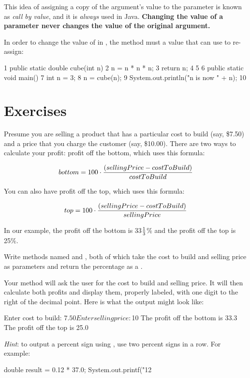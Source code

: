 This idea of assigning a copy of the argument's value to the parameter is known as {\em call by value}, and it is {\em always} used in Java.  {\bf Changing the value of a parameter never changes the value of the original argument.}

In order to change the value of  in , the  method must  a value that  can use to re-assign:

\begin{code}
 1 public static double cube(int n) {
 2     n = n * n * n;
 3     return n;
 4 }
 5
 6 public static void main() {
 7     int n = 3;
 8     n = cube(n);
 9     System.out.println("n is now " + n);
10 }

\end{code}

\section{Exercises}
\begin{exercise}
Presume you are selling a product that has a particular cost to build (say, \$7.50) and a price that you charge the customer (say, \$10.00). There are two ways to calculate your profit: profit off the bottom, which uses this formula:

\begin{equation*}
bottom = 100 \cdot {(sellingPrice - costToBuild) \over costToBuild}
\end{equation*}

You can also have profit off the top, which uses this formula:

\begin{equation*}
top = 100 \cdot {(sellingPrice - costToBuild) \over sellingPrice}
\end{equation*}

In our example, the profit off the bottom is 33$1\over 3$\% and the profit off the top is 25\%.

Write methods named  and , both of which take the cost to build and selling price as  parameters and return the percentage as a .

Your  method will ask the user for the cost to build and selling price. It will then calculate both profits and display them, properly labeled, with one digit to the right of the decimal point.
Here is what the output might look like:

\begin{stdout}
Enter cost to build: $7.50
Enter selling price: $10
The profit off the bottom is 33.3%
The profit off the top is 25.0%
\end{stdout}

{\it Hint}: to output a percent sign using , use two percent signs in a row. For example:

\begin{code}
double result = 0.12 * 37.0;
System.out.printf("12%
\end{code}

\end{exercise}

